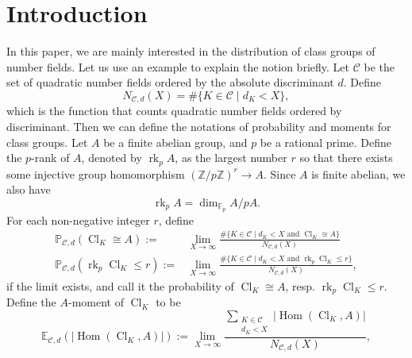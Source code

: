 \documentclass[12pt,a4paper]{amsart}
\numberwithin{equation}{section}%
\theoremstyle{plain}%
\theoremstyle{definition}%
\theoremstyle{remark}%
\begin{document}
	\section{Introduction}\label{section: intro}
	In this paper, we are mainly interested in the distribution of class groups of number fields.
	Let us use an example to explain the notion briefly.
	Let $\mathcal{C}$ be the set of quadratic number fields ordered by the absolute discriminant $d$.
	Define
	\begin{equation*}
		N_{\mathcal{C},d}(X)=\#\{K\in\mathcal{C}\mid d_K<X\},
	\end{equation*}
	which is the function that counts quadratic number fields ordered by discriminant.
	Then we can define the notations of probability and moments for class groups.
	Let $A$ be a finite abelian group, and $p$ be a rational prime.
	Define the $p$-rank of $A$, denoted by $\operatorname{rk}_pA$, as the largest number $r$ so that there exists some injective group homomorphism $(\mathbb{Z}/p\mathbb{Z})^r\to A$.
	Since $A$ is finite abelian, we also have
	\begin{equation*}
		\operatorname{rk}_{p}A=\dim_{\mathbb{F}_{p}}A/pA.
	\end{equation*}
	For each non-negative integer $r$, define
	\begin{equation*}
		\begin{aligned}
			\mathbb{P}_{\mathcal{C},d}(\operatorname{Cl}_K\cong A):=
			&\lim_{X\to\infty}
			\frac{
				\#\{K\in\mathcal{C}\mid d_K<X\text{ and }\operatorname{Cl}_K\cong A\}
			}
			{
				N_{\mathcal{C},d}(X)
			}
			\\
			\mathbb{P}_{\mathcal{C},d}(\operatorname{rk}_p\operatorname{Cl}_K\leq r):=
			&\lim_{X\to\infty}
			\frac{
				\#\{K\in\mathcal{C}\mid d_K<X\text{ and }\operatorname{rk}_p\operatorname{Cl}_K\leq r\}
			}
			{
				N_{\mathcal{C},d}(X)
			},
		\end{aligned}
	\end{equation*}
	if the limit exists,
	and call it the probability of $\operatorname{Cl}_K\cong A$, resp. $\operatorname{rk}_p\operatorname{Cl}_K\leq r$.
	Define the $A$-moment of $\operatorname{Cl}_K$ to be
	\begin{equation*}
		\mathbb{E}_{\mathcal{C},d}(\lvert\operatorname{Hom}(\operatorname{Cl}_K,A)\rvert):=
		\lim_{X\to\infty}
		\frac{
			\sum_{
				\substack{
					K\in\mathcal{C}\\
					d_K<X
				}
			}
			\lvert\operatorname{Hom}(\operatorname{Cl}_{K},A)\rvert
		}{
			N_{\mathcal{C},d}(X)
		},
	\end{equation*}
\end{document}
